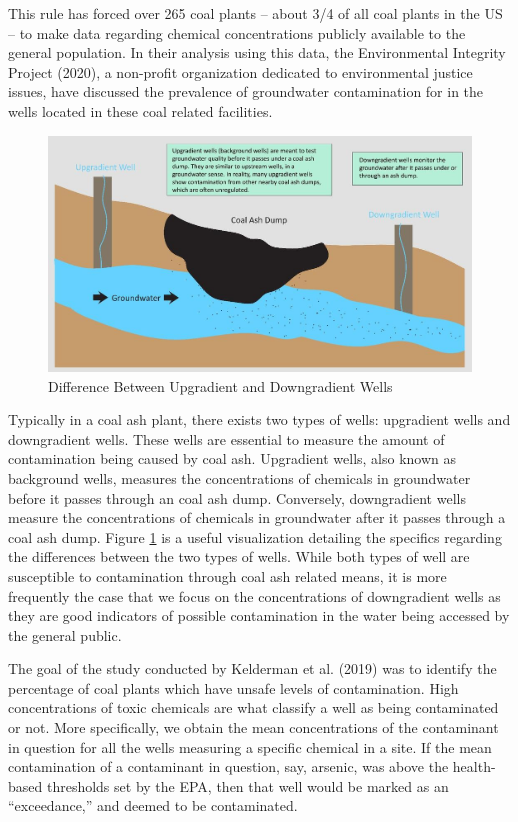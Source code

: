 \documentclass[12pt, twoside]{amherstthesis}
\begin{document}
This rule has forced over 265 coal plants -- about 3/4 of all coal plants in the US -- to make data regarding chemical concentrations publicly available to the general population. In their analysis using this data, the Environmental Integrity Project (2020), a non-profit organization dedicated to environmental justice issues, have discussed the prevalence of groundwater contamination for in the wells located in these coal related facilities.
\begin{figure}

{\centering \includegraphics[width=1\linewidth]{figures/upgradientdowngradient} 

}

\caption{Difference Between Upgradient and Downgradient Wells}\label{fig:upgradientdowngradient}
\end{figure}
Typically in a coal ash plant, there exists two types of wells: upgradient wells and downgradient wells. These wells are essential to measure the amount of contamination being caused by coal ash. Upgradient wells, also known as background wells, measures the concentrations of chemicals in groundwater before it passes through an coal ash dump. Conversely, downgradient wells measure the concentrations of chemicals in groundwater after it passes through a coal ash dump. Figure \ref{fig:upgradientdowngradient} is a useful visualization detailing the specifics regarding the differences between the two types of wells. While both types of well are susceptible to contamination through coal ash related means, it is more frequently the case that we focus on the concentrations of downgradient wells as they are good indicators of possible contamination in the water being accessed by the general public.

The goal of the study conducted by Kelderman et al. (2019) was to identify the percentage of coal plants which have unsafe levels of contamination. High concentrations of toxic chemicals are what classify a well as being contaminated or not. More specifically, we obtain the mean concentrations of the contaminant in question for all the wells measuring a specific chemical in a site. If the mean contamination of a contaminant in question, say, arsenic, was above the health-based thresholds set by the EPA, then that well would be marked as an ``exceedance,'' and deemed to be contaminated.
\end{document}
